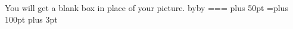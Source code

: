 %
\let\picturedefault=\relax
\let\parsefilename=\relax
\def\redopicturebox{\let\picturedefinition=\rel@x
   \errhelp=\disabledpictures
   \errmessage{This version of TeX cannot handle pictures.  Sorry.}}
\newhelp\disabledpictures
     {You will get a blank box in place of your picture.}
%
%
%
%
%
%
%
%
%
%
\def\FRONTPAGE{\ifvoid255\else\vfill\penalty-20000\fi
   \gl@bal\pagenumber=1     \gl@bal\chapternumber=0
   \gl@bal\equanumber=0     \gl@bal\sectionnumber=0
   \gl@bal\referencecount=0 \gl@bal\figurecount=0
   \gl@bal\tablecount=0     \gl@bal\frontpagetrue
   \gl@bal\lastf@@t=0       \gl@bal\footsymbolcount=0
   \gl@bal\cn@@false }
\let\Frontpage=\FRONTPAGE
%
\def\papers{\papersize\headline=\paperheadline\footline=\paperfootline}
%
\def\papersize{\hsize=35pc \vsize=50pc \hoffset=0pc \voffset=1pc
   \advance\hoffset by\HOFFSET \advance\voffset by\VOFFSET
   \pagebottomfiller=0pc
   \skip\footins=\bigskipamount \normalspace }
%
\papers  %
%
%
\newskip{}       {} plus 50pt
\newskip{}    {}=\z@ plus 100pt
\newskip\signatureskip       \signatureskip=40pt plus 3pt
%
\def\lettersize{\hsize=6.5in \vsize=8.5in \hoffset=0in \voffset=0.5in
   \advance\hoffset by\HOFFSET \advance\voffset by\VOFFSET
   \pagebottomfiller=\letterbottomskip
   \skip\footins=\smallskipamount \multiply\skip\footins by 3
   \singlespace }
